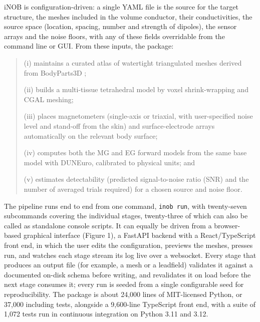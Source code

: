 \documentclass[11pt]{article}
\newcommand{\revised}[1]{#1}
\begin{document}
iNOB is configuration-driven: a single YAML file is the source for the
target structure, the meshes included in the volume conductor, their
conductivities, the source space (location, spacing, number and strength
of dipoles), the sensor arrays and the noise floors, with any of these
fields overridable from the command line or GUI. From these inputs, the
package:

\begin{quote}
(i) maintains a curated atlas of watertight triangulated meshes derived
from BodyParts3D \citep{241};

(ii) builds a multi-tissue tetrahedral model by voxel shrink-wrapping and
CGAL meshing;

(iii) places magnetometers (single-axis or triaxial, with user-specified
noise level and stand-off from the skin) and surface-electrode arrays
automatically on the relevant body surface;

(iv) computes both the MG and EG forward models from the same base model
with DUNEuro, calibrated to physical units; and

(v) estimates detectability (predicted signal-to-noise ratio (SNR) and
the number of averaged trials required) for a chosen source and noise
floor.
\end{quote}

The pipeline runs end to end from one command, \texttt{inob run}, with \revised{twenty-seven}
subcommands covering the individual stages, twenty-three of which can
also be called as standalone console scripts. It can equally be driven
from a browser-based graphical interface (Figure 1), a FastAPI backend
with a React/TypeScript front end, in which the user edits the
configuration, previews the meshes, presses run, and watches each stage
stream its log live over a websocket. Every stage that produces an
output file (for example, a mesh or a leadfield) validates it against a
documented on-disk schema before writing, and revalidates it on load
before the next stage consumes it; every run is seeded from a single
configurable seed for reproducibility. The package is about \revised{24,000} lines
of MIT-licensed Python, or \revised{37,000} including tests, alongside a
\revised{9,600}-line TypeScript front end, with a suite of \revised{1,072} tests run in
continuous integration on Python 3.11 and 3.12.
\end{document}
